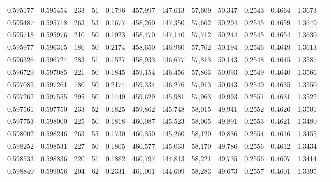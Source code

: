 \begin{tabular}{rrrrrrrrrrrrr}
0.595177 & 0.595454 &   233 &  51 &                                     0.1796 & 457,997 & 147,613 &  57,609 &  50,347 & 0.2543 & 0.4664 & 1.3673 \\
0.595487 & 0.595718 &   263 &  53 &                                     0.1677 & 458,260 & 147,350 &  57,662 &  50,294 & 0.2545 & 0.4659 & 1.3649 \\
0.595718 & 0.595976 &   210 &  50 &                                     0.1923 & 458,470 & 147,140 &  57,712 &  50,244 & 0.2545 & 0.4654 & 1.3630 \\
0.595977 & 0.596315 &   180 &  50 &                                     0.2174 & 458,650 & 146,960 &  57,762 &  50,194 & 0.2546 & 0.4649 & 1.3613 \\
0.596326 & 0.596724 &   283 &  51 &                                     0.1527 & 458,933 & 146,677 &  57,813 &  50,143 & 0.2548 & 0.4645 & 1.3587 \\
0.596729 & 0.597085 &   221 &  50 &                                     0.1845 & 459,154 & 146,456 &  57,863 &  50,093 & 0.2549 & 0.4640 & 1.3566 \\
0.597085 & 0.597261 &   180 &  50 &                                     0.2174 & 459,334 & 146,276 &  57,913 &  50,043 & 0.2549 & 0.4635 & 1.3550 \\
0.597262 & 0.597555 &   295 &  50 &                                     0.1449 & 459,629 & 145,981 &  57,963 &  49,993 & 0.2551 & 0.4631 & 1.3522 \\
0.597561 & 0.597750 &   233 &  52 &                                     0.1825 & 459,862 & 145,748 &  58,015 &  49,941 & 0.2552 & 0.4626 & 1.3501 \\
0.597753 & 0.598000 &   225 &  50 &                                     0.1818 & 460,087 & 145,523 &  58,065 &  49,891 & 0.2553 & 0.4621 & 1.3480 \\
0.598002 & 0.598246 &   263 &  55 &                                     0.1730 & 460,350 & 145,260 &  58,120 &  49,836 & 0.2554 & 0.4616 & 1.3455 \\
0.598252 & 0.598531 &   227 &  50 &                                     0.1805 & 460,577 & 145,033 &  58,170 &  49,786 & 0.2556 & 0.4612 & 1.3434 \\
0.598533 & 0.598836 &   220 &  51 &                                     0.1882 & 460,797 & 144,813 &  58,221 &  49,735 & 0.2556 & 0.4607 & 1.3414 \\
0.598840 & 0.599056 &   204 &  62 &                                     0.2331 & 461,001 & 144,609 &  58,283 &  49,673 & 0.2557 & 0.4601 & 1.3395 \\

\end{tabular}
